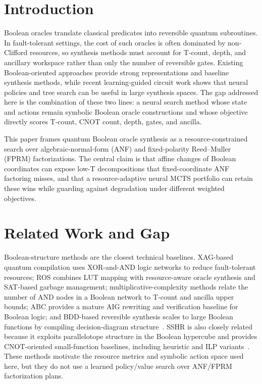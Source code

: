 \documentclass[11pt]{article}
\begin{document}
\section{Introduction}

Boolean oracles translate classical predicates into reversible quantum
subroutines.  In fault-tolerant settings, the cost of such oracles is often
dominated by non-Clifford resources, so synthesis methods must account for
T-count, depth, and ancillary workspace rather than only the number of reversible
gates.  Existing Boolean-oriented approaches provide strong representations and
baseline synthesis methods, while recent learning-guided circuit work shows
that neural policies and tree search can be useful in large synthesis spaces.
The gap addressed here is the combination of these two lines: a neural search
method whose state and actions remain symbolic Boolean oracle constructions and
whose objective directly scores T-count, CNOT count, depth, gates, and ancilla.

This paper frames quantum Boolean oracle synthesis as a resource-constrained
search over algebraic-normal-form (ANF) and fixed-polarity Reed--Muller (FPRM)
factorizations.  The central claim is that affine changes of Boolean coordinates
can expose low-T decompositions that fixed-coordinate ANF factoring misses, and
that a resource-adaptive neural MCTS portfolio can retain these wins while
guarding against degradation under different weighted objectives.

\section{Related Work and Gap}

Boolean-structure methods are the closest technical baselines.  XAG-based
quantum compilation uses XOR-and-AND logic networks to reduce fault-tolerant
resources; ROS combines LUT mapping with resource-aware oracle synthesis and
SAT-based garbage management; multiplicative-complexity methods relate the
number of AND nodes in a Boolean network to T-count and ancilla upper bounds;
ABC provides a mature AIG rewriting and verification baseline for Boolean logic;
and BDD-based reversible synthesis scales to large Boolean functions by
compiling decision-diagram
structure~\cite{meuli2022xag,meuli2020ros,meuli2019multiplicative,brayton2010abc,wille2009bdd}.
SSHR is also closely related because it exploits parallelotope structure in the
Boolean hypercube and provides CNOT-oriented small-function baselines,
including heuristic and ILP variants~\cite{zheng2025sshr}.  These methods
motivate the resource metrics and symbolic action space used here, but they do
not use a learned policy/value search over ANF/FPRM factorization plans.
\end{document}
